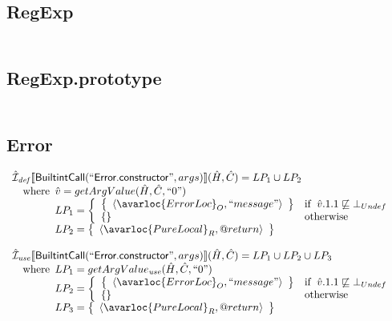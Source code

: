 \subsection{RegExp}
\[
\begin{array}{l}
\end{array}
\]

\subsection{RegExp.prototype}
\[
\begin{array}{l}
\end{array}
\]

\subsection{Error}
\[
\begin{array}{l}

\aI_{\it def}\lbr \SF{BuiltintCall}(``\SF{Error.constructor}",args)\rbr(\hat{H},\hat{C})
  = LP_1 \cup LP_2\\
\quad\wherec{
  \hat{v} = getArgValue(\hat{H}, \hat{C}, ``0")\\
  LP_1 = \left\{\begin{array}{ll}
  \set{\langle\avarloc{ErrorLoc}_O, ``message"\rangle} & \ifc{\hat{v}.1.1 \not\sqsubseteq \bot_{Undef}}\\
  \set{} & \owc\\
    \end{array}\right.\\
  LP_2 = \set{\langle\avarloc{PureLocal}_R,\varprop{return}\rangle}\\
  }\\
\\


\aI_{\it use}\lbr \SF{BuiltintCall}(``\SF{Error.constructor}",args)\rbr(\hat{H},\hat{C})
  = LP_1 \cup LP_2 \cup LP_3\\
\quad\wherec{
  LP_1 = getArgValue_{\it use}(\hat{H}, \hat{C}, ``0")\\
  LP_2 = \left\{\begin{array}{ll}
  \set{\langle\avarloc{ErrorLoc}_O, ``message"\rangle} & \ifc{\hat{v}.1.1 \not\sqsubseteq \bot_{Undef}}\\
  \set{} & \owc\\
    \end{array}\right.\\
  LP_3 = \set{\langle\avarloc{PureLocal}_R,\varprop{return}\rangle}\\
  }\\
\\

\end{array}
\]

